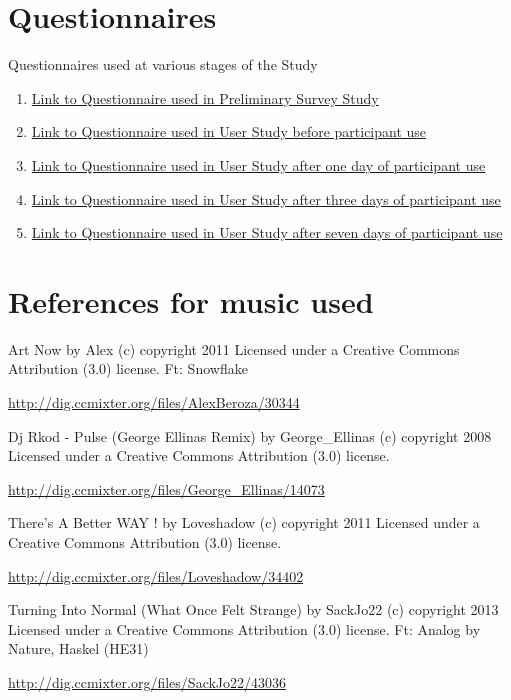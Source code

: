 \documentclass{l4proj}
\begin{document}
\begin{appendices}
\chapter{Questionnaires}
\label{appendix:questionnaires}
\begin{description}\item Questionnaires used at various stages of the Study\end{description}
\begin{enumerate}
    \item \href{https://docs.google.com/forms/d/1pakX7XYVLeoAOoYjkXVDSh09DWRrcNKFbN93KbzdtMg/prefill}{Link to Questionnaire used in Preliminary Survey Study}
    \item \href{https://docs.google.com/forms/d/1JbD9k1n20KKGAkHvTEXJXE3pGRheN1uez2E0XOwcXZU/prefill}{Link to Questionnaire used in User Study before participant use}
    \item \href{https://docs.google.com/forms/d/1sm2wlPlcC8mvK1OyvnOXUq5_tHZXC1h9BahmidPfutQ/prefill}{Link to Questionnaire used in User Study after one day of participant use}
    \item \href{https://docs.google.com/forms/d/1heEV_uBCCTCK5g-J18M_eL7aD9sfJnWIl7B-Aie7A4c/prefill}{Link to Questionnaire used in User Study after three days of participant use}
    \item \href{https://docs.google.com/forms/d/1NoNhfJRtZiw-utZUCW7sfjN9cYZxTzjtm8tA7g0-hdo/prefill}{Link to Questionnaire used in User Study after seven days of participant use}
\end{enumerate}
    



\chapter{References for music used}
\begin{description}
    \item Art Now by Alex (c) copyright 2011 Licensed under a Creative Commons Attribution (3.0) license. Ft: Snowflake
    \item \url{http://dig.ccmixter.org/files/AlexBeroza/30344}
\item
    \item Dj Rkod - Pulse (George Ellinas Remix) by George\_Ellinas (c) copyright 2008 Licensed under a Creative Commons Attribution (3.0) license.
    \item \url{http://dig.ccmixter.org/files/George_Ellinas/14073 }
\item
    \item There's A Better WAY ! by Loveshadow (c) copyright 2011 Licensed under a Creative Commons Attribution (3.0) license. 
    \item \url{http://dig.ccmixter.org/files/Loveshadow/34402 }
\item
    \item Turning Into Normal (What Once Felt Strange) by SackJo22 (c) copyright 2013 Licensed under a Creative Commons Attribution (3.0) license. Ft: Analog by Nature, Haskel (HE31)
    \item \url{http://dig.ccmixter.org/files/SackJo22/43036}
\end{description}



\end{appendices}
\end{document}
